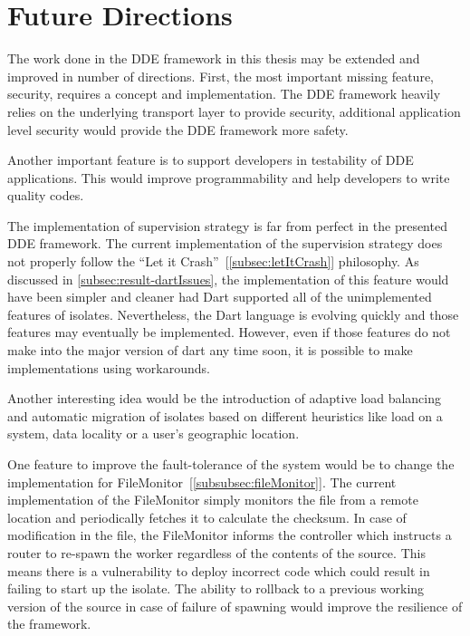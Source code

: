 \chapter{Future Directions}\label{chapter:future_directions}



  The work done in the DDE framework in this thesis may be extended and improved in number of directions. First, the most important missing feature, security, requires a concept and implementation. The DDE framework heavily relies on the underlying transport layer to provide security, additional application level security would provide the DDE framework more safety.

  Another important feature is to support developers in testability of DDE applications. This would improve programmability and help developers to write quality codes.

  The implementation of supervision strategy is far from perfect in the presented DDE framework. The current implementation of the supervision strategy does not properly follow the “Let it Crash”~[\autoref{subsec:letItCrash}] philosophy. As discussed in \autoref{subsec:result-dartIssues}, the implementation of this feature would have been simpler and cleaner had Dart supported all of the unimplemented features of isolates. Nevertheless, the Dart language is evolving quickly and those features may eventually be implemented. However, even if those features do not make into the major version of dart any time soon, it is possible to make implementations using workarounds.

  Another interesting idea would be the introduction of adaptive load balancing and automatic migration of isolates based on different heuristics like load on a system, data locality or a user's geographic location.

  One feature to improve the fault-tolerance of the system would be to change the implementation for FileMonitor~[\autoref{subsubsec:fileMonitor}]. The current implementation of the FileMonitor simply monitors the file from a remote location and periodically fetches it to calculate the checksum. In case of modification in the file, the FileMonitor informs the controller which instructs a router to re-spawn the worker regardless of the contents of the source. This means there is a vulnerability to deploy incorrect code which could result in failing to start up the isolate. The ability to rollback to a previous working version of the source in case of failure of spawning would improve the resilience of the framework.

